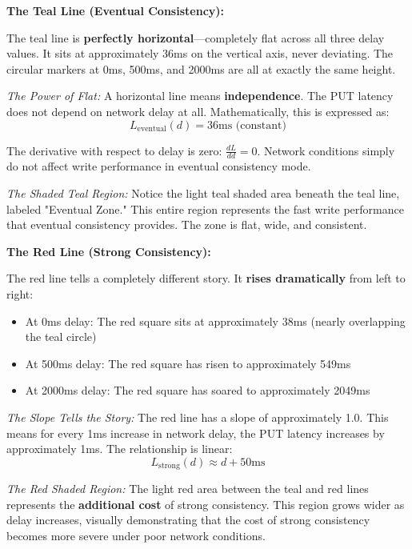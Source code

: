 \documentclass[10pt,a4paper]{article}
\begin{document}
\textbf{The Teal Line (Eventual Consistency):}

The teal line is \textbf{perfectly horizontal}---completely flat across all three delay values. It sits at approximately 36ms on the vertical axis, never deviating. The circular markers at 0ms, 500ms, and 2000ms are all at exactly the same height.

\textit{The Power of Flat:} A horizontal line means \textbf{independence}. The PUT latency does not depend on network delay at all. Mathematically, this is expressed as:
\begin{equation}
L_{\text{eventual}}(d) = 36\text{ms (constant)}
\end{equation}

The derivative with respect to delay is zero: $\frac{dL}{dd} = 0$. Network conditions simply do not affect write performance in eventual consistency mode.

\textit{The Shaded Teal Region:} Notice the light teal shaded area beneath the teal line, labeled "Eventual Zone." This entire region represents the fast write performance that eventual consistency provides. The zone is flat, wide, and consistent.

\textbf{The Red Line (Strong Consistency):}

The red line tells a completely different story. It \textbf{rises dramatically} from left to right:
\begin{itemize}
    \item At 0ms delay: The red square sits at approximately 38ms (nearly overlapping the teal circle)
    \item At 500ms delay: The red square has risen to approximately 549ms
    \item At 2000ms delay: The red square has soared to approximately 2049ms
\end{itemize}

\textit{The Slope Tells the Story:} The red line has a slope of approximately 1.0. This means for every 1ms increase in network delay, the PUT latency increases by approximately 1ms. The relationship is linear:
\begin{equation}
L_{\text{strong}}(d) \approx d + 50\text{ms}
\end{equation}

\textit{The Red Shaded Region:} The light red area between the teal and red lines represents the \textbf{additional cost} of strong consistency. This region grows wider as delay increases, visually demonstrating that the cost of strong consistency becomes more severe under poor network conditions.
\end{document}
